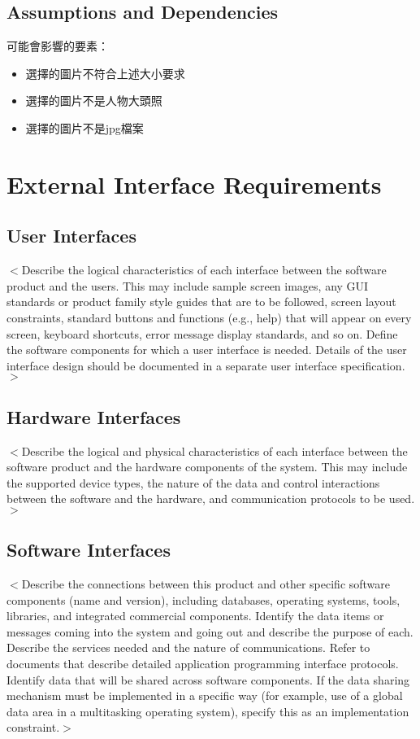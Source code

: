 \documentclass{scrreprt}
\begin{document}
\begin{CJK}{UTF8}{bkai}
\section{Assumptions and Dependencies}
可能會影響的要素：
\begin{itemize}
    \item 選擇的圖片不符合上述大小要求
    \item 選擇的圖片不是人物大頭照
    \item 選擇的圖片不是jpg檔案
\end{itemize}


\chapter{External Interface Requirements}

\section{User Interfaces}
$<$Describe the logical characteristics of each interface between the software 
product and the users. This may include sample screen images, any GUI standards 
or product family style guides that are to be followed, screen layout 
constraints, standard buttons and functions (e.g., help) that will appear on 
every screen, keyboard shortcuts, error message display standards, and so on.  
Define the software components for which a user interface is needed. Details of 
the user interface design should be documented in a separate user interface 
specification.$>$

\section{Hardware Interfaces}
$<$Describe the logical and physical characteristics of each interface between 
the software product and the hardware components of the system. This may include 
the supported device types, the nature of the data and control interactions 
between the software and the hardware, and communication protocols to be 
used.$>$

\section{Software Interfaces}
$<$Describe the connections between this product and other specific software 
components (name and version), including databases, operating systems, tools, 
libraries, and integrated commercial components. Identify the data items or 
messages coming into the system and going out and describe the purpose of each.  
Describe the services needed and the nature of communications. Refer to 
documents that describe detailed application programming interface protocols.  
Identify data that will be shared across software components. If the data 
sharing mechanism must be implemented in a specific way (for example, use of a 
global data area in a multitasking operating system), specify this as an 
implementation constraint.$>$



\end{CJK}
\end{document}
